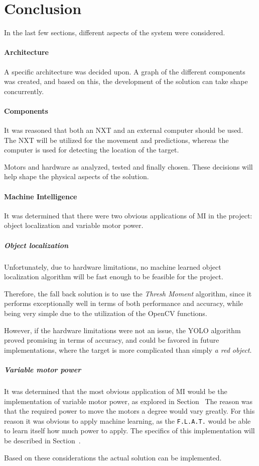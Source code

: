 \section{Conclusion}
In the last few sections, different aspects of the system were considered.

\paragraph{Architecture}
A specific architecture was decided upon.
A graph of the different components was created, and based on this, the development of the solution can take shape concurrently.


\paragraph{Components}
It was reasoned that both an NXT and an external computer should be used.
The NXT will be utilized for the movement and predictions, whereas the computer is used for detecting the location of the target.


Motors and hardware as analyzed, tested and finally chosen.
These decisions will help shape the physical aspects of the solution.


\paragraph{Machine Intelligence}
It was determined that there were two obvious applications of MI in the project: object localization and variable motor power.

\subparagraph{Object localization}
Unfortunately, due to hardware limitations, no machine learned object localization algorithm will be fast enough to be feasible for the project.

Therefore, the fall back solution is to use the \textit{Thresh Moment} algorithm, since it performs exceptionally well in terms of both performance and accuracy, while being very simple due to the utilization of the OpenCV functions.

However, if the hardware limitations were not an issue, the YOLO algorithm proved promising in terms of accuracy, and could be favored in future implementations, where the target is more complicated than simply \textit{a red object}.

\subparagraph{Variable motor power}
It was determined that the most obvious application of MI would be the implementation of variable motor power, as explored in Section~
The reason was that the required power to move the motors a degree would vary greatly.
For this reason it was obvious to apply machine learning, as the \texttt{F.L.A.T.} would be able to learn itself how much power to apply.
The specifics of this implementation will be described in Section~.


Based on these considerations the actual solution can be implemented.
